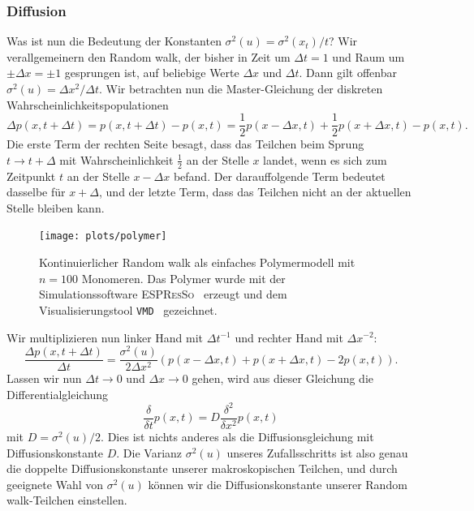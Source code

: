 \subsubsection{Diffusion}

Was ist nun die Bedeutung der Konstanten $\sigma^2(u) =
\sigma^2(x_t)/t$?  Wir verallgemeinern den Random walk, der bisher in
Zeit um $\Delta t=1$ und Raum um $\pm\Delta x = \pm 1$ gesprungen ist,
auf beliebige Werte $\Delta x$ und $\Delta t$. Dann gilt offenbar $
\sigma^2(u) = \Delta x^2/\Delta t$. Wir betrachten nun die
Master-Gleichung der diskreten Wahrscheinlichkeitspopulationen
\begin{equation}
  \Delta p(x, t + \Delta t) = p(x, t + \Delta t) - p(x, t) =
  \frac{1}{2}p(x - \Delta x, t) +
  \frac{1}{2}p(x + \Delta x, t) - p(x, t).
\end{equation}
Die erste Term der rechten Seite besagt, dass das Teilchen beim Sprung
$t\to t +\Delta$ mit Wahrscheinlichkeit $\frac{1}{2}$ an der Stelle
$x$ landet, wenn es sich zum Zeitpunkt $t$ an der Stelle $x-\Delta x$
befand. Der darauffolgende Term bedeutet dasselbe für $x+\Delta$, und
der letzte Term, dass das Teilchen nicht an der aktuellen Stelle
bleiben kann.

\begin{figure}
  \centering
  \texttt{[image: plots/polymer]}
  \caption{Kontinuierlicher Random walk als einfaches Polymermodell mit
    $n=100$ Monomeren. Das Polymer wurde mit der Simulationssoftware
    \textsc{ESPResSo}~\cite{espresso} erzeugt und dem
    Visualisierungstool \texttt{VMD}~\cite{vmd} gezeichnet.}
  \label{fig:contrw}
\end{figure}

Wir multiplizieren nun linker Hand mit $\Delta t^{-1}$ und rechter Hand mit
$\Delta x^{-2}$:
\begin{equation}
  \frac{\Delta p(x, t + \Delta t)}{\Delta t} =
  \frac{\sigma^2(u)}{2\Delta x^2} \left(p(x - \Delta x, t) +
    p(x + \Delta x, t) - 2 p(x, t)\right).
\end{equation}
Lassen wir nun $\Delta t\to 0$ und $\Delta x\to 0$ gehen, wird aus
dieser Gleichung die Differentialgleichung
\begin{equation}
  \frac{\delta}{\delta t} p(x, t) =
  D\frac{\delta^2}{\delta x^2} p(x, t)
\end{equation}
mit $D=\sigma^2(u)/2$.  Dies ist nichts anderes als die
Diffusionsgleichung mit Diffusionskonstante $D$. Die Varianz
$\sigma^2(u)$ unseres Zufallsschritts ist also genau die doppelte
Diffusionskonstante unserer makroskopischen Teilchen, und durch
geeignete Wahl von $\sigma^2(u)$ können wir die Diffusionskonstante
unserer Random walk-Teilchen einstellen.

